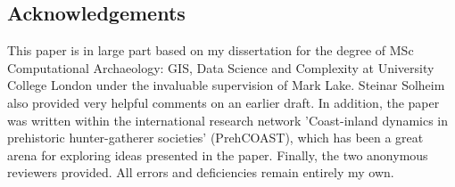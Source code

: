 \documentclass[12pt, a4paper]{article}
\begin{document}
\subsection*{Acknowledgements}
This paper is in large part based on my dissertation for the degree of MSc Computational Archaeology: GIS, Data Science and Complexity at University College London under the invaluable supervision of Mark Lake. Steinar Solheim also provided very helpful comments on an earlier draft. In addition, the paper was written within the international research network 'Coast-inland dynamics in prehistoric hunter-gatherer societies' (PrehCOAST), which has been a great arena for exploring ideas presented in the paper. Finally, the two anonymous reviewers provided.  All errors and deficiencies remain entirely my own.


\end{document}

